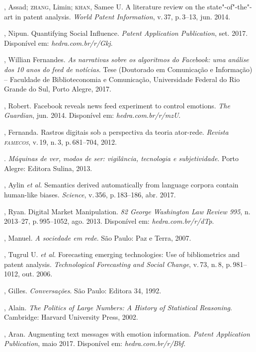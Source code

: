 \begin{bibliohedra}
, Assad; \textsc{zhang}, Limin; \textsc{khan}, Samee U. A literature review on the state"-of"-the"-art in patent analysis. \textit{World Patent Information}, v.\,37, p.\,3--13,  jun. 2014.

, Nipun. Quantifying Social Influence. \textit{Patent Application Publication}, set. 2017. Disponível em: \textit{hedra.com.br/r/Gkj}.

, Willian Fernandes. \textit{As narrativas sobre os algoritmos do Facebook: uma
análise dos 10 anos do feed de notícias}. Tese (Doutorado em Comunicação e Informação) --
Faculdade de Biblioteconomia e Comunicação, Universidade Federal do Rio Grande do Sul,
Porto Alegre, 2017.

, Robert. Facebook reveals news feed experiment to control
emotions. \textit{The Guardian}, jun. 2014. Disponível em: \textit{hedra.com.br/r/mzU}.

, Fernanda. Rastros digitais sob a perspectiva da teoria
ator-rede. \textit{Revista \textsc{famecos}}, v.\,19, n.\,3, p.\,681--704, 2012.

\titidem. \textit{Máquinas de ver, modos de ser: vigilância,
tecnologia e subjetividade}. Porto Alegre: Editora Sulina, 2013.

, Aylin \textit{et al.} Semantics derived automatically from
language corpora contain human-like biases. \textit{Science}, v.\,356, p.\,183--186, abr. 2017.

, Ryan. Digital Market Manipulation. \textit{82 George Washington
Law Review 995}, n.\,2013--27, p.\,995--1052, ago. 2013. Disponível em: \textit{hedra.com.br/r/dTp}.

, Manuel. \textit{A sociedade em rede}. São Paulo: Paz e Terra, 2007.

, Tugrul U. \textit{et al.} Forecasting emerging technologies: Use
of bibliometrics and patent analysis. \textit{Technological Forecasting and
Social Change}, v.\,73, n.\,8, p.\,981--1012, out. 2006.

, Gilles. \textit{Conversações}. São Paulo: Editora 34, 1992.

, Alain. \textit{The Politics of Large Numbers: A History of
Statistical Reasoning}. Cambridge: Harvard University Press, 2002.

, Aran. Augmenting text messages with emotion information. \textit{Patent Application Publication}, maio 2017. Disponível em: \textit{hedra.com.br/r/Bbf}.


\end{bibliohedra}

